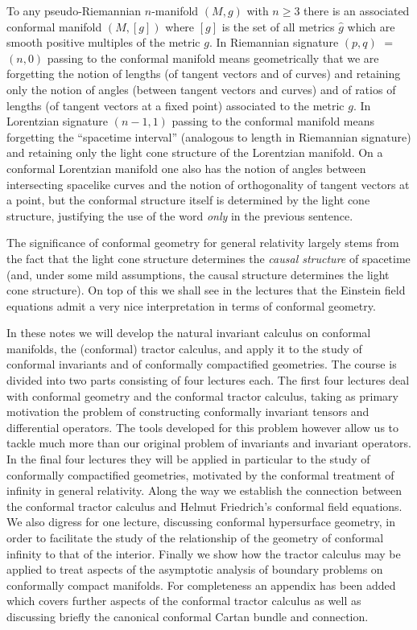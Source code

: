 \documentclass[a4paper,12pt]{amsart}
\theoremstyle{remark}
\begin{document}
To any pseudo-Riemannian $n$-manifold $(M,g)$ with $n\geq3$ there is an associated conformal manifold $(M,[g])$ where $[g]$ is the set of all metrics $\hat{g}$ which are smooth positive multiples of the metric $g$. In Riemannian signature $(p,q)$ $=$ $(n,0)$ passing to the conformal manifold means geometrically that we are forgetting the notion of lengths (of tangent vectors and of curves) and retaining only the notion of angles (between tangent vectors and curves) and of ratios of lengths (of tangent vectors at a fixed point) associated to the metric $g$. In Lorentzian signature $(n-1,1)$ passing to the conformal manifold means forgetting the ``spacetime interval'' (analogous to length in Riemannian signature) and retaining only the light cone structure of the Lorentzian manifold. On a conformal Lorentzian manifold one also has the notion of angles between intersecting spacelike curves and the notion of orthogonality of tangent vectors at a point, but the conformal structure itself is determined by the light cone structure, justifying the use of the word \emph{only} in the previous sentence. 

The significance of conformal geometry for general relativity largely stems from the fact that the light cone structure determines the \emph{causal structure} of spacetime (and, under some mild assumptions, the causal structure determines the light cone structure). On top of this we shall see in the lectures that the Einstein field equations admit a very nice interpretation in terms of conformal geometry.

In these notes we will develop the natural invariant calculus on conformal manifolds, the (conformal) tractor calculus, and apply it to the study of conformal invariants and of conformally compactified geometries. The course is divided into two parts consisting of four lectures each. The first four lectures deal with conformal geometry and the conformal tractor calculus, taking as primary motivation the problem of constructing conformally invariant tensors and differential operators. The tools developed for this problem however allow us to tackle much more than our original problem of invariants and invariant operators. In the final four lectures they will be applied in particular to the study of conformally compactified geometries, motivated by the conformal treatment of infinity in general relativity. Along the way we establish the connection between the conformal tractor calculus and Helmut Friedrich's conformal field equations. We also digress for one lecture, discussing conformal hypersurface geometry, in order to facilitate the study of the relationship of the geometry of conformal infinity to that of the interior. Finally we show how the tractor calculus may be applied to treat aspects of the asymptotic analysis of boundary problems on conformally compact manifolds. For completeness an appendix has been added which covers further aspects of the conformal tractor calculus as well as discussing briefly the canonical conformal Cartan bundle and connection.
\end{document}
